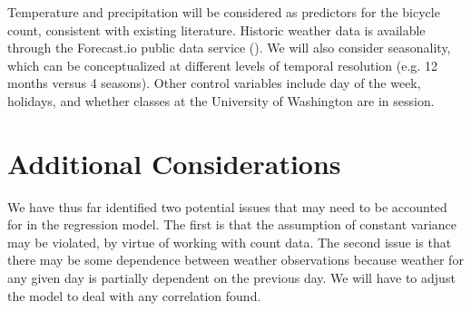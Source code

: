 \documentclass[10pt,letterpaper,article]{memoir} %
\begin{document}
Temperature and precipitation will be considered as predictors for the
bicycle count, consistent with existing literature. Historic weather
data is available through the Forecast.io public data service
(\cite{The-Dark-Sky-Company:aa}). We will also consider
seasonality, which can be conceptualized at different levels of
temporal resolution (e.g. 12 months versus 4 seasons). Other control
variables include day of the week, holidays, and whether classes at
the University of Washington are in session.

\chapter*{Additional Considerations}
We have thus far identified two potential issues that may need to be
accounted for in the regression model. The first is that the
assumption of constant variance may be violated, by virtue of working
with count data. The second issue is that there may be some dependence
between weather observations because weather for any given day is 
partially dependent on the previous day.  We will have to adjust the 
model to deal with any correlation found.

\printbibliography
\end{document}
